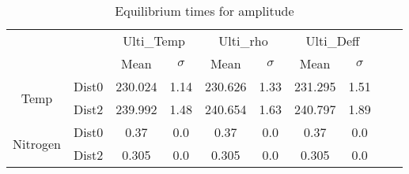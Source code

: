 \begin{table}[h]
\centering
\caption{Equilibrium times for amplitude}
\label{table:5}
\begin{tabular}{cccccccccc}
\toprule
 &  & \multicolumn{2}{c}{Ulti_Temp} & \multicolumn{2}{c}{Ulti_rho} & \multicolumn{2}{c}{Ulti_Deff} \\
 &  & Mean & $\sigma$ & Mean & $\sigma$ & Mean & $\sigma$ \\
\midrule
\multirow[c]{2}{*}{Temp} & Dist0 & 230.024 & 1.14 & 230.626 & 1.33 & 231.295 & 1.51 \\
 & Dist2 & 239.992 & 1.48 & 240.654 & 1.63 & 240.797 & 1.89 \\
\multirow[c]{2}{*}{Nitrogen} & Dist0 & 0.37 & 0.0 & 0.37 & 0.0 & 0.37 & 0.0 \\
 & Dist2 & 0.305 & 0.0 & 0.305 & 0.0 & 0.305 & 0.0 \\
\bottomrule
\end{tabular}
\end{table}
